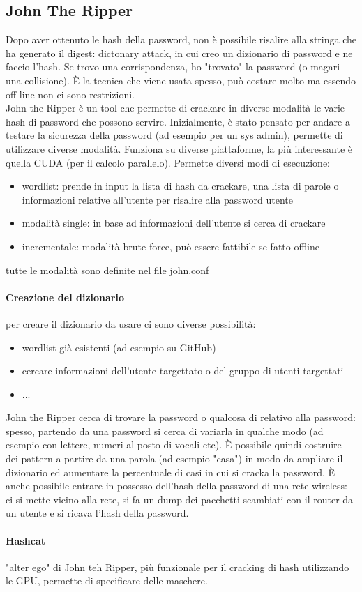 \documentclass{article}
\begin{document}
\subsection{John The Ripper}
Dopo aver ottenuto le hash della password, non è possibile risalire alla stringa che ha generato il digest: dictonary attack, in cui creo un dizionario di password e ne faccio l'hash. Se trovo una corrispondenza, ho "trovato" la password (o magari una collisione). È la tecnica che viene usata spesso, può costare molto ma essendo off-line non ci sono restrizioni. 
\\ John the Ripper è un tool che permette di crackare in diverse modalità le varie hash di password che possono servire. Inizialmente, è stato pensato per andare a testare la sicurezza della password (ad esempio per un sys admin), permette di utilizzare diverse modalità. Funziona su diverse piattaforme, la più interessante è quella CUDA (per il calcolo parallelo). Permette diversi modi di esecuzione:
\begin{itemize}
\item wordlist: prende in input la lista di hash da crackare, una lista di parole o informazioni relative all'utente per risalire alla password utente
\item modalità single: in base ad informazioni dell'utente si cerca di crackare
\item incrementale: modalità brute-force, può essere fattibile se fatto offline
\end{itemize}
tutte le modalità sono definite nel file john.conf
\paragraph{Creazione del dizionario}per creare il dizionario da usare ci sono diverse possibilità:
\begin{itemize}
\item wordlist già esistenti (ad esempio su GitHub)
\item cercare informazioni dell'utente targettato o del gruppo di utenti targettati
\item ...
\end{itemize}
John the Ripper cerca di trovare la password o qualcosa di relativo alla password: spesso, partendo da una password si cerca di variarla in qualche modo (ad esempio con lettere, numeri al posto di vocali etc). È possibile quindi costruire dei pattern a partire da una parola (ad esempio "casa") in modo da ampliare il dizionario ed aumentare la percentuale di casi in cui si cracka la password. È anche possibile entrare in possesso dell'hash della password di una rete wireless: ci si mette vicino alla rete, si fa un dump dei pacchetti scambiati con il router da un utente e si ricava l'hash della password.
\paragraph{Hashcat}"alter ego" di John teh Ripper, più funzionale per il cracking di hash utilizzando le GPU, permette di specificare delle maschere.
\end{document}
